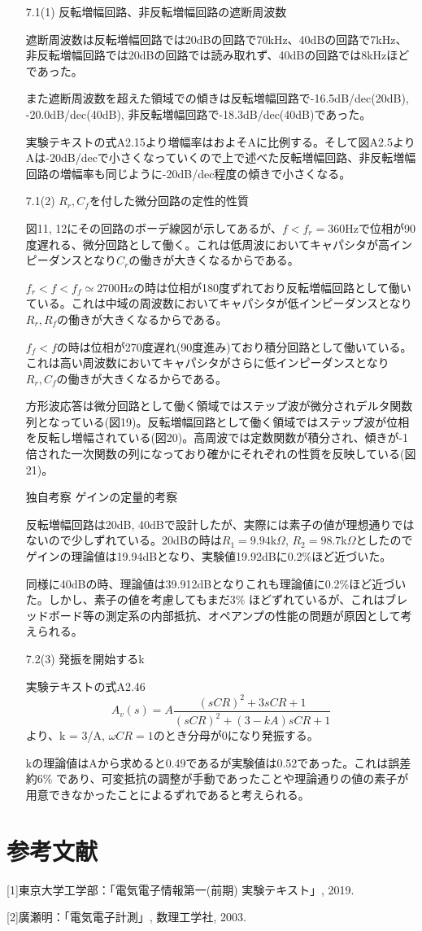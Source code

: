 \documentclass[dvipdfmx, twocolumn]{jsarticle}
\begin{document}
\begin{enumerate}

\item[7.1(1)]
反転増幅回路、非反転増幅回路の遮断周波数

遮断周波数は反転増幅回路では20dBの回路で70kHz、40dBの回路で7kHz、非反転増幅回路では20dBの回路では読み取れず、40dBの回路では8kHzほどであった。

また遮断周波数を超えた領域での傾きは反転増幅回路で-16.5dB/dec(20dB), -20.0dB/dec(40dB), 非反転増幅回路で-18.3dB/dec(40dB)であった。

実験テキストの式A2.15より増幅率はおよそAに比例する。そして図A2.5よりAは-20dB/decで小さくなっていくので上で述べた反転増幅回路、非反転増幅回路の増幅率も同じように-20dB/dec程度の傾きで小さくなる。



\item[7.1(2)]
$R_{r}, C_{f}を付した微分回路の定性的性質$

図11, 12にその回路のボーデ線図が示してあるが、$f<f_{r} = 360$Hzで位相が90度遅れる、微分回路として働く。これは低周波においてキャパシタが高インピーダンスとなり$C_{r}$の働きが大きくなるからである。

$f_{r}<f<f_{f} \simeq 2700$Hzの時は位相が180度ずれており反転増幅回路として働いている。これは中域の周波数においてキャパシタが低インピーダンスとなり$R_{r}, R_{f}$の働きが大きくなるからである。

$f_{f}<f$の時は位相が270度遅れ(90度進み)ており積分回路として働いている。これは高い周波数においてキャパシタがさらに低インピーダンスとなり$R_{r}, C_{f}$の働きが大きくなるからである。

方形波応答は微分回路として働く領域ではステップ波が微分されデルタ関数列となっている(図19)。反転増幅回路として働く領域ではステップ波が位相を反転し増幅されている(図20)。高周波では定数関数が積分され、傾きが-1倍された一次関数の列になっており確かにそれぞれの性質を反映している(図21)。




\item[独自考察]ゲインの定量的考察

反転増幅回路は20dB, 40dBで設計したが、実際には素子の値が理想通りではないので少しずれている。20dBの時は$R_{1} = 9.94$k$\Omega$, $R_{2} = 98.7$k$\Omega$としたのでゲインの理論値は19.94dBとなり、実験値19.92dBに0.2\%ほど近づいた。

同様に40dBの時、理論値は39.912dBとなりこれも理論値に0.2\%ほど近づいた。しかし、素子の値を考慮してもまだ3\% ほどずれているが、これはブレッドボード等の測定系の内部抵抗、オペアンプの性能の問題が原因として考えられる。



\item[7.2(3)]
発振を開始するk

実験テキストの式A2.46
\[ A_{v}(s) = A\frac{(sCR)^{2}+3sCR+1}{(sCR)^{2}+(3-kA)sCR+1}\]
より、k = 3/A, $\omega CR = 1$のとき分母が0になり発振する。

kの理論値はAから求めると0.49であるが実験値は0.52であった。これは誤差約6\% であり、可変抵抗の調整が手動であったことや理論通りの値の素子が用意できなかったことによるずれであると考えられる。


\end{enumerate}
\section{参考文献}
[1]東京大学工学部：「電気電子情報第一(前期) 実験テキスト」, 2019.

[2]廣瀬明：「電気電子計測」, 数理工学社, 2003.
\end{document}
